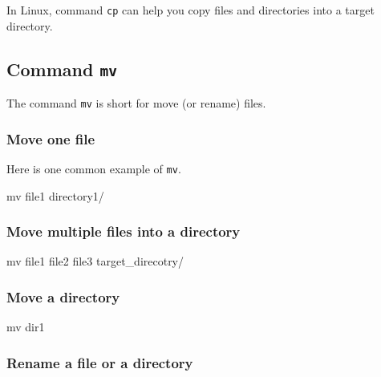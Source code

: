 \documentclass[]{book}
\makeatletter
\newenvironment{Shaded}{\begin{snugshade}}{\end{snugshade}}
\newcommand{\FunctionTok}[1]{\textcolor[rgb]{0.00,0.00,0.00}{#1}}
\newcommand{\NormalTok}[1]{#1}
\newenvironment{kframe}{%
\medskip{}
\setlength{\fboxsep}{.8em}
 \def\at@end@of@kframe{}%
 \ifinner\ifhmode%
  \def\at@end@of@kframe{\end{minipage}}%
  \begin{minipage}{\columnwidth}%
 \fi\fi%
 \def\FrameCommand##1{\hskip\@totalleftmargin \hskip-\fboxsep
 \colorbox{shadecolor}{##1}\hskip-\fboxsep
     \hskip-\linewidth \hskip-\@totalleftmargin \hskip\columnwidth}%
 \MakeFramed {\advance\hsize-\width
   \@totalleftmargin\z@ \linewidth\hsize
   \@setminipage}}%
 {\par\unskip\endMakeFramed%
 \at@end@of@kframe}
\renewenvironment{Shaded}{\begin{kframe}}{\end{kframe}}
\makeatother
\begin{document}
In Linux, command \texttt{cp} can help you copy files and directories into a target directory.

\hypertarget{command-mv}{%
\subsection{\texorpdfstring{Command \texttt{mv}}{Command mv}}\label{command-mv}}

The command \texttt{mv} is short for move (or rename) files.

\hypertarget{move-one-file}{%
\subsubsection{Move one file}\label{move-one-file}}

Here is one common example of \texttt{mv}.

\begin{Shaded}
\begin{Highlighting}[]

\FunctionTok{mv}\NormalTok{ file1 directory1/}
\end{Highlighting}
\end{Shaded}

\hypertarget{move-multiple-files-into-a-directory}{%
\subsubsection{Move multiple files into a directory}\label{move-multiple-files-into-a-directory}}

\begin{Shaded}
\begin{Highlighting}[]
\FunctionTok{mv}\NormalTok{ file1 file2 file3 target_direcotry/}
\end{Highlighting}
\end{Shaded}

\hypertarget{move-a-directory}{%
\subsubsection{Move a directory}\label{move-a-directory}}

\begin{Shaded}
\begin{Highlighting}[]
\FunctionTok{mv}\NormalTok{ dir1}
\end{Highlighting}
\end{Shaded}

\hypertarget{rename-a-file-or-a-directory}{%
\subsubsection{Rename a file or a directory}\label{rename-a-file-or-a-directory}}
\end{document}
